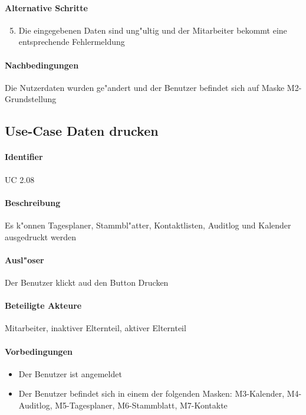   \paragraph{Alternative Schritte}
  \begin{enumerate}
  \setcounter{enumi}{4}
   \item Die eingegebenen Daten sind ung"ultig und der Mitarbeiter bekommt eine entsprechende Fehlermeldung
  \end{enumerate}

  \paragraph{Nachbedingungen}
  Die Nutzerdaten wurden ge"andert und der Benutzer befindet sich auf Maske M2-Grundstellung

  
  \newpage
 \subsection{Use-Case Daten drucken}
  \paragraph{Identifier}
  UC 2.08
  \paragraph{Beschreibung}
  Es k"onnen Tagesplaner, Stammbl"atter, Kontaktlisten, Auditlog und Kalender ausgedruckt werden
  \paragraph{Ausl"oser}
    Der Benutzer klickt aud den Button \dq Drucken\dq
  \paragraph{Beteiligte Akteure}   \leavevmode \newline
    Mitarbeiter, inaktiver Elternteil, aktiver Elternteil
  \paragraph{Vorbedingungen}
  \begin{itemize}
   \item Der Benutzer ist angemeldet
   \item Der Benutzer befindet sich in einem der folgenden Masken: M3-Kalender, M4-Auditlog, M5-Tagesplaner, M6-Stammblatt, M7-Kontakte
  \end{itemize}

